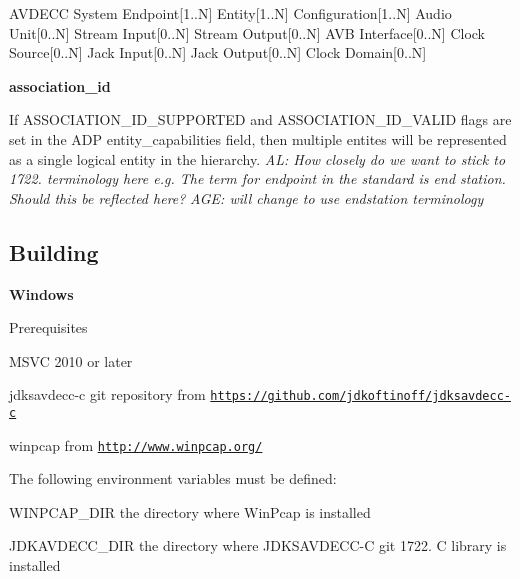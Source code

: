 \begin{DoxyVerb}AVDECC System
  Endpoint[1..N]
    Entity[1..N]
        Configuration[1..N]
            Audio Unit[0..N]
            Stream Input[0..N]
            Stream Output[0..N]
            AVB Interface[0..N]
            Clock Source[0..N]
            Jack Input[0..N]
            Jack Output[0..N]
            Clock Domain[0..N]
\end{DoxyVerb}


{\bfseries association\+\_\+id}

If A\+S\+S\+O\+C\+I\+A\+T\+I\+O\+N\+\_\+\+I\+D\+\_\+\+S\+U\+P\+P\+O\+R\+T\+ED and A\+S\+S\+O\+C\+I\+A\+T\+I\+O\+N\+\_\+\+I\+D\+\_\+\+V\+A\+L\+ID flags are set in the A\+DP entity\+\_\+capabilities field, then multiple entites will be represented as a single logical entity in the hierarchy. {\itshape AL\+: How closely do we want to stick to 1722. terminology here e.\+g. The term for endpoint in the standard is \textquotesingle{}end station\textquotesingle{}. Should this be reflected here?} {\itshape A\+GE\+: will change to use endstation terminology}

\subsection*{Building }

{\bfseries Windows}

Prerequisites


\begin{DoxyEnumerate}
\item M\+S\+VC 2010 or later
\end{DoxyEnumerate}
\begin{DoxyEnumerate}
\item jdksavdecc-\/c git repository from \href{https://github.com/jdkoftinoff/jdksavdecc-c}{\tt https\+://github.\+com/jdkoftinoff/jdksavdecc-\/c}
\end{DoxyEnumerate}
\begin{DoxyEnumerate}
\item winpcap from \href{http://www.winpcap.org/}{\tt http\+://www.\+winpcap.\+org/}
\end{DoxyEnumerate}

The following environment variables must be defined\+:
\begin{DoxyItemize}
\item W\+I\+N\+P\+C\+A\+P\+\_\+\+D\+IR the directory where Win\+Pcap is installed
\item J\+D\+K\+A\+V\+D\+E\+C\+C\+\_\+\+D\+IR the directory where J\+D\+K\+S\+A\+V\+D\+E\+C\+C-\/C git 1722. C library is installed
\end{DoxyItemize}

